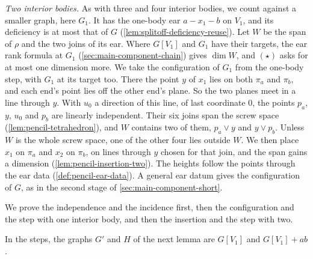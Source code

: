 \emph{Two interior bodies.} As with three and four interior bodies, we
count against a smaller graph, here $G_1$. It has the one-body ear
$a - x_1 - b$ on $V_1$, and its deficiency is at most that of $G$
(\cref{lem:splitoff-deficiency-reuse}). Let $W$ be the span of $\rho$ and
the two joins of its ear. Where $G[V_1]$ and $G_1$ have their targets, the
ear rank formula at $G_1$ (\cref{sec:main-component-chain}) gives
$\dim W$, and $(\star)$ asks for at most one dimension more. We take the
configuration of $G_1$ from the one-body step, with $G_1$ at its target
too. There the point $y$ of $x_1$ lies on both $\pi_a$ and $\pi_b$, and
each end's point lies off the other end's plane. So the two planes meet in
a line through $y$. With $u_0$ a direction of this line, of last
coordinate $0$, the points $p_a$, $y$, $u_0$ and $p_b$ are linearly
independent. Their six joins span the screw space
(\cref{lem:pencil-tetrahedron}), and $W$ contains two of them,
$p_a \vee y$ and $y \vee p_b$. Unless $W$ is the whole screw space,
one of the other four lies outside $W$. We then place $x_1$ on $\pi_a$
and $x_2$ on $\pi_b$, on lines through $y$ chosen for that join, and the
span gains a dimension (\cref{lem:pencil-insertion-two}). The heights
follow the points through the ear data (\cref{def:pencil-ear-data}). A
general ear datum gives the configuration of $G$, as in the second stage
of \cref{sec:main-component-short}.

We prove the independence and the incidence first, then the
configuration and the step with one interior body, and then the
insertion and the step with two.

In the steps, the graphs $G'$ and $H$ of the next lemma are $G[V_1]$ and
$G[V_1] + ab$.

